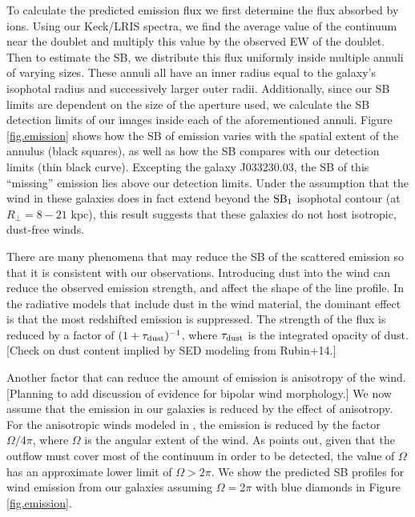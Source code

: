 \documentclass[twocolumn]{aastex61}
\begin{document}
To calculate the predicted emission flux we first determine the flux absorbed by  ions. Using our Keck/LRIS spectra, we find the average value of the continuum near the  doublet and multiply this value by the observed EW of the doublet. Then to estimate the SB, we distribute this flux uniformly inside multiple annuli of varying sizes. These annuli all have an inner radius equal to the galaxy's isophotal radius and successively larger outer radii.  Additionally, since our SB limits are dependent on the size of the aperture used, we calculate the SB detection limits of our images inside each of the aforementioned annuli. Figure \ref{fig.emission} shows how the SB of emission varies with the spatial extent of the annulus (black squares), as well as how the SB compares with our detection limits (thin black curve). Excepting the galaxy J033230.03, the SB of this ``missing'' emission lies above our detection limits. %
Under the assumption that the wind in these galaxies does in fact extend beyond the $\rm SB_1$ isophotal contour (at $R_{\perp} = 8-21$ kpc), this result suggests that these galaxies do not host  isotropic, dust-free winds.  

There are many phenomena that may reduce the SB of the scattered  emission so that it is consistent with our observations. Introducing dust into the wind can reduce the observed emission strength, and affect the shape of the line profile. 
In the \cite{Prochaska_2011} radiative models that include dust in the wind material, the dominant effect %
 is that  the most redshifted emission is suppressed. The strength of the flux is reduced by a factor of $(1+\tau_{\rm{dust}})^{-1}$, where $\tau_{\rm{dust}}$ is the integrated opacity of dust.  [Check on dust content implied by SED modeling from Rubin+14.]

Another factor that can reduce the amount of emission is anisotropy of the wind. 
[Planning to add discussion of evidence for bipolar wind morphology.]
We now assume that the emission in our galaxies is reduced by the effect of anisotropy.  %
For the anisotropic winds modeled in \cite{Prochaska_2011}, the emission is reduced by the factor $\Omega/4\pi$, where $\Omega$ is the angular extent of the wind. 
As \citet{Prochaska_2011} points out, given that the outflow must cover most of the continuum in order to be detected, the value of $\Omega$ has an approximate lower limit of $\Omega > 2\pi$.
We show the predicted SB profiles for wind emission from our galaxies assuming  $\Omega = 2\pi$ with blue diamonds in Figure  \ref{fig.emission}.
\end{document}
